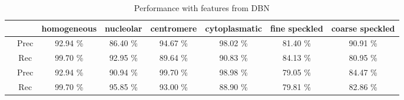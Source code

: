 \begin{table}
	\caption{Performance with features from DBN}
	\label{tab:FulSys}
	\small
	\begin{tabular}{|c c||c|c|c|c|c|c|}
		\hline
		& & homogeneous & nucleolar & centromere & cytoplasmatic & fine speckled & coarse speckled \\
		\hline
		\multirow{2}{*}{\rotatebox[origin=c]{90}{\tiny RIPPER}} & Prec & 92.94 \% & 86.40 \% & 94.67 \% &  98.02 \% & 81.40 \% & 90.91 \% \\
		 & Rec & 99.70 \% & 92.95 \% & 89.64 \% & 90.83 \% & 84.13 \% & 80.95 \% \\
		 \hline
		  \multirow{2}{*}{\rotatebox[origin=c]{90}{DT}} & Prec & 92.94 \% & 90.94 \% & 99.70 \% & 98.98 \% & 79.05 \% & 84.47 \% \\
		   & Rec & 99.70 \% & 95.85 \% & 93.00 \% & 88.90 \% & 79.81 \% & 82.86 \% \\
		   \hline
	\end{tabular}
\end{table}





